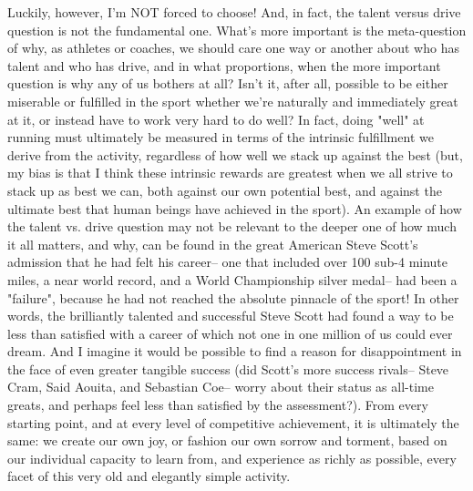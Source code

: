 Luckily, however, I'm NOT forced to choose! And, in fact, the talent versus drive question is not the fundamental one. What's more important is the meta-question of why, as athletes or coaches, we should care one way or another about who has talent and who has drive, and in what proportions, when the more important question is why any of us bothers at all? Isn't it, after all, possible to be either miserable or fulfilled in the sport whether we're naturally and immediately great at it, or instead have to work very hard to do well? In fact, doing "well" at running must ultimately be measured in terms of the intrinsic fulfillment we derive from the activity, regardless of how well we stack up against the best (but, my bias is that I think these intrinsic rewards are greatest when we all strive to stack up as best we can, both against our own potential best, and against the ultimate best that human beings have achieved in the sport). An example of how the talent vs. drive question may not be relevant to the deeper one of how much it all matters, and why, can be found in the great American Steve Scott's admission that he had felt his career-- one that included over 100 sub-4 minute miles, a near world record, and a World Championship silver medal-- had been a "failure", because he had not reached the absolute pinnacle of the sport! In other words, the brilliantly talented and successful Steve Scott had found a way to be less than satisfied with a career of which not one in one million of us could ever dream. And I imagine it would be possible to find a reason for disappointment in the face of even greater tangible success (did Scott's more success rivals-- Steve Cram, Said Aouita, and Sebastian Coe-- worry about their status as all-time greats, and perhaps feel less than satisfied by the assessment?). From every starting point, and at every level of competitive achievement, it is ultimately the same: we create our own joy, or fashion our own sorrow and torment, based on our individual capacity to learn from, and experience as richly as possible, every facet of this very old and elegantly simple activity.





